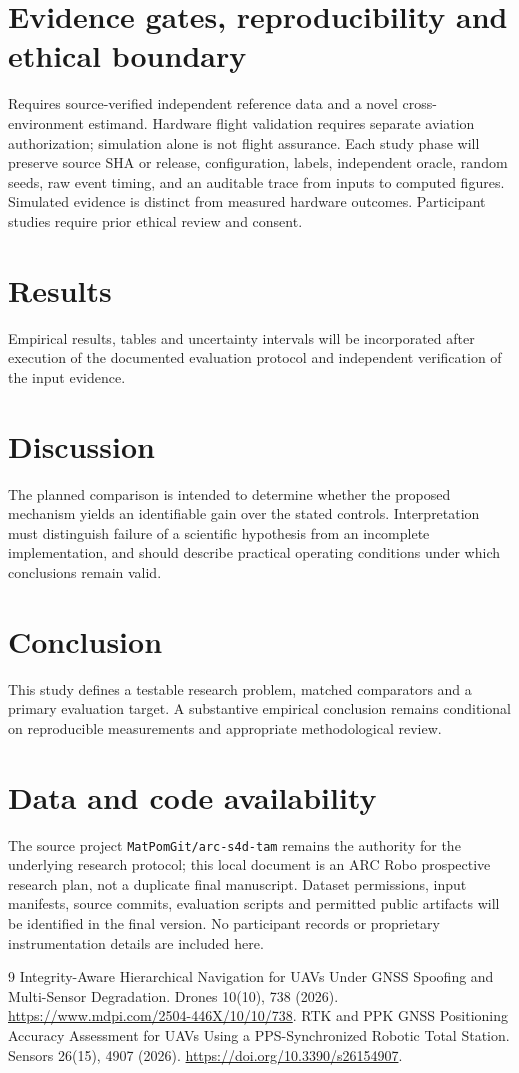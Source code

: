 \documentclass[11pt,a4paper]{article}
\begin{document}
\section{Evidence gates, reproducibility and ethical boundary}
Requires source-verified independent reference data and a novel cross-environment estimand. Hardware flight validation requires separate aviation authorization; simulation alone is not flight assurance. Each study phase will preserve source SHA or release, configuration, labels, independent oracle, random seeds, raw event timing, and an auditable trace from inputs to computed figures. Simulated evidence is distinct from measured hardware outcomes. Participant studies require prior ethical review and consent.

\section{Results}
Empirical results, tables and uncertainty intervals will be incorporated after execution of the documented evaluation protocol and independent verification of the input evidence.

\section{Discussion}
The planned comparison is intended to determine whether the proposed mechanism yields an identifiable gain over the stated controls. Interpretation must distinguish failure of a scientific hypothesis from an incomplete implementation, and should describe practical operating conditions under which conclusions remain valid.

\section{Conclusion}
This study defines a testable research problem, matched comparators and a primary evaluation target. A substantive empirical conclusion remains conditional on reproducible measurements and appropriate methodological review.

\section{Data and code availability}
The source project \texttt{MatPomGit/arc-s4d-tam} remains the authority for the underlying research protocol; this local document is an ARC Robo prospective research plan, not a duplicate final manuscript. Dataset permissions, input manifests, source commits, evaluation scripts and permitted public artifacts will be identified in the final version. No participant records or proprietary instrumentation details are included here.
\begin{thebibliography}{9}
 Integrity-Aware Hierarchical Navigation for UAVs Under GNSS Spoofing and Multi-Sensor Degradation. Drones 10(10), 738 (2026). \url{https://www.mdpi.com/2504-446X/10/10/738}.
 RTK and PPK GNSS Positioning Accuracy Assessment for UAVs Using a PPS-Synchronized Robotic Total Station. Sensors 26(15), 4907 (2026). \url{https://doi.org/10.3390/s26154907}.
\end{thebibliography}
\end{document}
